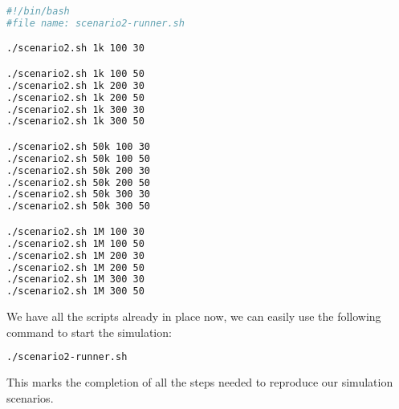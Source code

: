\begin{lstlisting}[language=bash]
#!/bin/bash
#file name: scenario2-runner.sh

./scenario2.sh 1k 100 30

./scenario2.sh 1k 100 50
./scenario2.sh 1k 200 30
./scenario2.sh 1k 200 50
./scenario2.sh 1k 300 30
./scenario2.sh 1k 300 50

./scenario2.sh 50k 100 30
./scenario2.sh 50k 100 50
./scenario2.sh 50k 200 30
./scenario2.sh 50k 200 50
./scenario2.sh 50k 300 30
./scenario2.sh 50k 300 50

./scenario2.sh 1M 100 30
./scenario2.sh 1M 100 50
./scenario2.sh 1M 200 30
./scenario2.sh 1M 200 50
./scenario2.sh 1M 300 30
./scenario2.sh 1M 300 50

\end{lstlisting}
\vspace{5mm}
We have all the scripts already in place now, we can easily use the following command to start the simulation:
\begin{lstlisting}[language=bash]
./scenario2-runner.sh
\end{lstlisting}

\vspace{5mm}

This marks the completion of all the steps needed to reproduce our simulation scenarios.
